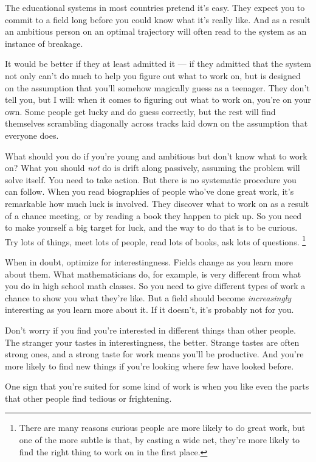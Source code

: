 The educational systems in most countries pretend it's easy. They expect
you to commit to a field long before you could know what it's really
like. And as a result an ambitious person on an optimal trajectory will
often read to the system as an instance of breakage.

It would be better if they at least admitted it --- if they admitted
that the system not only can't do much to help you figure out what to
work on, but is designed on the assumption that you'll somehow magically
guess as a teenager. They don't tell you, but I will: when it comes to
figuring out what to work on, you're on your own. Some people get lucky
and do guess correctly, but the rest will find themselves scrambling
diagonally across tracks laid down on the assumption that everyone does.

What should you do if you're young and ambitious but don't know what to
work on? What you should \emph{not} do is drift along passively,
assuming the problem will solve itself. You need to take action. But
there is no systematic procedure you can follow. When you read
biographies of people who've done great work, it's remarkable how much
luck is involved. They discover what to work on as a result of a chance
meeting, or by reading a book they happen to pick up. So you need to
make yourself a big target for luck, and the way to do that is to be
curious. Try lots of things, meet lots of people, read lots of books,
ask lots of questions. \footnote{There are many reasons curious people are more likely to do
great work, but one of the more subtle is that, by casting a wide net,
they're more likely to find the right thing to work on in the first
place.}

When in doubt, optimize for interestingness. Fields change as you learn
more about them. What mathematicians do, for example, is very different
from what you do in high school math classes. So you need to give
different types of work a chance to show you what they're like. But a
field should become \emph{increasingly} interesting as you learn more
about it. If it doesn't, it's probably not for you.

Don't worry if you find you're interested in different things than other
people. The stranger your tastes in interestingness, the better. Strange
tastes are often strong ones, and a strong taste for work means you'll
be productive. And you're more likely to find new things if you're
looking where few have looked before.

One sign that you're suited for some kind of work is when you like even
the parts that other people find tedious or frightening.

